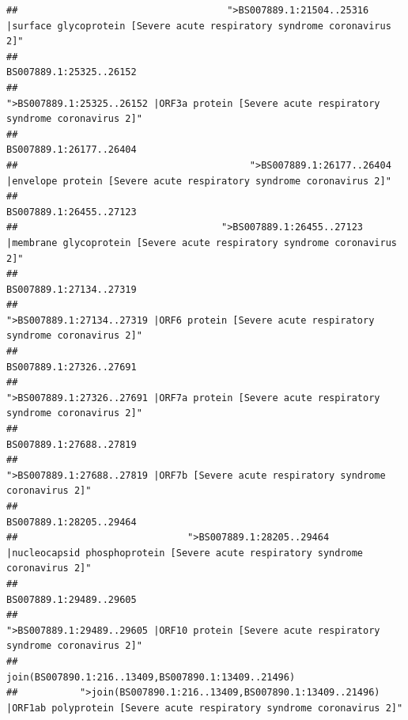 \documentclass[
]{article}
\begin{document}
\begin{verbatim}
##                                     ">BS007889.1:21504..25316 |surface glycoprotein [Severe acute respiratory syndrome coronavirus 2]" 
##                                                                                                                BS007889.1:25325..26152 
##                                            ">BS007889.1:25325..26152 |ORF3a protein [Severe acute respiratory syndrome coronavirus 2]" 
##                                                                                                                BS007889.1:26177..26404 
##                                         ">BS007889.1:26177..26404 |envelope protein [Severe acute respiratory syndrome coronavirus 2]" 
##                                                                                                                BS007889.1:26455..27123 
##                                    ">BS007889.1:26455..27123 |membrane glycoprotein [Severe acute respiratory syndrome coronavirus 2]" 
##                                                                                                                BS007889.1:27134..27319 
##                                             ">BS007889.1:27134..27319 |ORF6 protein [Severe acute respiratory syndrome coronavirus 2]" 
##                                                                                                                BS007889.1:27326..27691 
##                                            ">BS007889.1:27326..27691 |ORF7a protein [Severe acute respiratory syndrome coronavirus 2]" 
##                                                                                                                BS007889.1:27688..27819 
##                                                    ">BS007889.1:27688..27819 |ORF7b [Severe acute respiratory syndrome coronavirus 2]" 
##                                                                                                                BS007889.1:28205..29464 
##                              ">BS007889.1:28205..29464 |nucleocapsid phosphoprotein [Severe acute respiratory syndrome coronavirus 2]" 
##                                                                                                                BS007889.1:29489..29605 
##                                            ">BS007889.1:29489..29605 |ORF10 protein [Severe acute respiratory syndrome coronavirus 2]" 
##                                                                                    join(BS007890.1:216..13409,BS007890.1:13409..21496) 
##           ">join(BS007890.1:216..13409,BS007890.1:13409..21496) |ORF1ab polyprotein [Severe acute respiratory syndrome coronavirus 2]" 

\end{verbatim}
\end{document}
